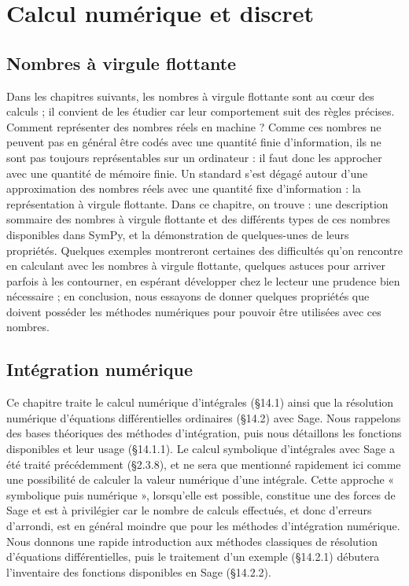 \part{Calcul numérique et discret}
\chapter{Nombres à virgule flottante}
Dans les chapitres suivants, les nombres à virgule flottante sont au cœur des
calculs ; il convient de les étudier car leur comportement suit des règles précises.
Comment représenter des nombres réels en machine ? Comme ces nombres ne
peuvent pas en général être codés avec une quantité finie d’information, ils ne
sont pas toujours représentables sur un ordinateur : il faut donc les approcher
avec une quantité de mémoire finie.
Un standard s’est dégagé autour d’une approximation des nombres réels avec
une quantité fixe d’information : la représentation à virgule flottante.
Dans ce chapitre, on trouve : une description sommaire des nombres à virgule
flottante et des différents types de ces nombres disponibles dans SymPy, et la 
démonstration de quelques-unes de leurs propriétés. Quelques exemples montreront
certaines des difficultés qu’on rencontre en calculant avec les nombres à virgule
flottante, quelques astuces pour arriver parfois à les contourner, en espérant 
développer chez le lecteur une prudence bien nécessaire ; en conclusion, nous essayons
de donner quelques propriétés que doivent posséder les méthodes numériques pour
pouvoir être utilisées avec ces nombres.

\chapter{Intégration numérique}
Ce chapitre traite le calcul numérique d’intégrales (§14.1) ainsi que la résolution
numérique d’équations différentielles ordinaires (§14.2) avec Sage. Nous rappelons
des bases théoriques des méthodes d’intégration, puis nous détaillons les fonctions
disponibles et leur usage (§14.1.1). Le calcul symbolique d’intégrales avec Sage a été traité précédemment (§2.3.8), et ne sera que mentionné rapidement ici comme une possibilité de calculer la
valeur numérique d’une intégrale. Cette approche « symbolique puis numérique »,
lorsqu’elle est possible, constitue une des forces de Sage et est à privilégier car le
nombre de calculs effectués, et donc d’erreurs d’arrondi, est en général moindre
que pour les méthodes d’intégration numérique.
Nous donnons une rapide introduction aux méthodes classiques de résolution
d’équations différentielles, puis le traitement d’un exemple (§14.2.1) débutera
l’inventaire des fonctions disponibles en Sage (§14.2.2).

